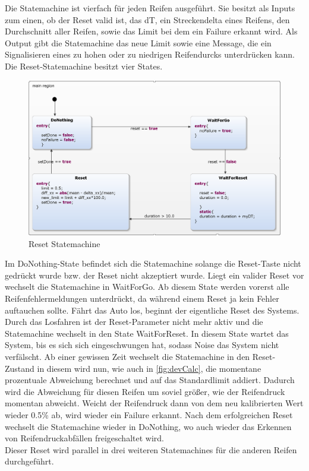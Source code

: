 Die Statemachine ist vierfach für jeden Reifen ausgeführt. Sie besitzt als Inputs zum einen, ob der Reset valid ist, das dT, ein Streckendelta eines Reifens, den Durchschnitt aller Reifen, sowie das Limit bei dem ein Failure erkannt wird. Als Output gibt die Statemachine das neue Limit sowie eine Message, die ein Signalisieren eines zu hohen oder zu niedrigen Reifendurcks unterdrücken kann.\\
Die Reset-Statemachine besitzt vier States.
\begin{figure}[H]
	\centering
	\includegraphics[width=1\linewidth]{../Graphiken/ResetStateMachine.png}
	\caption{Reset Statemachine}
	\label{fig:ResetStateMachine}
\end{figure}
Im DoNothing-State befindet sich die Statemachine solange die Reset-Taste nicht gedrückt wurde bzw. der Reset nicht akzeptiert wurde. Liegt ein valider Reset vor wechselt die Statemachine in WaitForGo. Ab diesem State werden vorerst alle Reifenfehlermeldungen unterdrückt, da während einem Reset ja kein Fehler auftauchen sollte. Fährt das Auto los, beginnt der eigentliche Reset des Systems. Durch das Losfahren ist der Reset-Parameter nicht mehr aktiv und die Statemachine wechselt in den State WaitForReset. In diesem State wartet das System, bis es sich sich eingeschwungen hat, sodass Noise das System nicht verfälscht. Ab einer gewissen Zeit wechselt die Statemachine in den Reset-Zustand in diesem wird nun, wie auch in \autoref{fig:devCalc}, die momentane prozentuale Abweichung berechnet und auf das Standardlimit addiert. Dadurch wird die Abweichung für diesen Reifen um soviel größer, wie der Reifendruck momentan abweicht. Weicht der Reifendruck dann von dem neu kalibrierten Wert wieder 0.5\% ab, wird wieder ein Failure erkannt. Nach dem erfolgreichen Reset wechselt die Statemachine wieder in DoNothing, wo auch wieder das Erkennen von Reifendruckabfällen freigeschaltet wird.\\
Dieser Reset wird parallel in drei weiteren Statemachines für die anderen Reifen durchgeführt.\\

